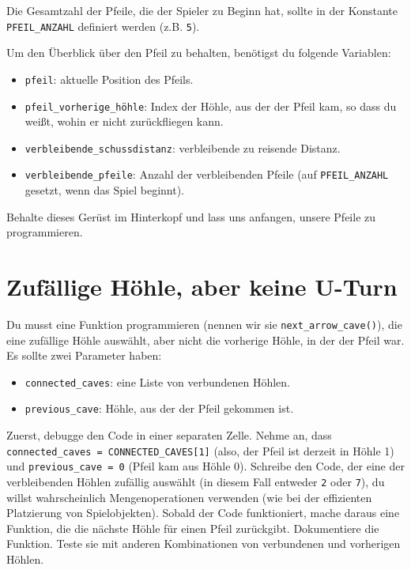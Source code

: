 \documentclass[
]{book}
\providecommand{\tightlist}{%
  \setlength{\itemsep}{0pt}\setlength{\parskip}{0pt}}
\begin{document}
Die Gesamtzahl der Pfeile, die der Spieler zu Beginn hat, sollte in der Konstante \texttt{PFEIL\_ANZAHL} definiert werden (z.B. \texttt{5}).

Um den Überblick über den Pfeil zu behalten, benötigst du folgende Variablen:

\begin{itemize}
\tightlist
\item
  \texttt{pfeil}: aktuelle Position des Pfeils.
\item
  \texttt{pfeil\_vorherige\_höhle}: Index der Höhle, aus der der Pfeil kam, so dass du weißt, wohin er nicht zurückfliegen kann.
\item
  \texttt{verbleibende\_schussdistanz}: verbleibende zu reisende Distanz.
\item
  \texttt{verbleibende\_pfeile}: Anzahl der verbleibenden Pfeile (auf \texttt{PFEIL\_ANZAHL} gesetzt, wenn das Spiel beginnt).
\end{itemize}

Behalte dieses Gerüst im Hinterkopf und lass uns anfangen, unsere Pfeile zu programmieren.

\hypertarget{zufuxe4llige-huxf6hle-aber-keine-u-turn}{%
\section{Zufällige Höhle, aber keine U-Turn}\label{zufuxe4llige-huxf6hle-aber-keine-u-turn}}

Du musst eine Funktion programmieren (nennen wir sie \texttt{next\_arrow\_cave()}), die eine zufällige Höhle auswählt, aber nicht die vorherige Höhle, in der der Pfeil war. Es sollte zwei Parameter haben:

\begin{itemize}
\tightlist
\item
  \texttt{connected\_caves}: eine Liste von verbundenen Höhlen.
\item
  \texttt{previous\_cave}: Höhle, aus der der Pfeil gekommen ist.
\end{itemize}

Zuerst, debugge den Code in einer separaten Zelle. Nehme an, dass \texttt{connected\_caves\ =\ CONNECTED\_CAVES{[}1{]}} (also, der Pfeil ist derzeit in Höhle 1) und \texttt{previous\_cave\ =\ 0} (Pfeil kam aus Höhle 0). Schreibe den Code, der eine der verbleibenden Höhlen zufällig auswählt (in diesem Fall entweder \texttt{2} oder \texttt{7}), du willst wahrscheinlich Mengenoperationen verwenden (wie bei der effizienten Platzierung von Spielobjekten). Sobald der Code funktioniert, mache daraus eine Funktion, die die nächste Höhle für einen Pfeil zurückgibt. Dokumentiere die Funktion. Teste sie mit anderen Kombinationen von verbundenen und vorherigen Höhlen.
\end{document}
